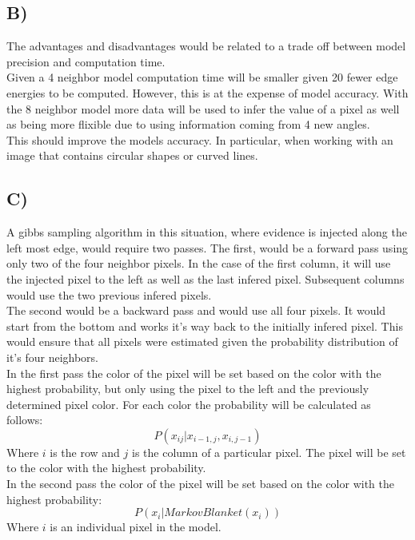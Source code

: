 \documentclass{report}
\begin{document}
\subsection*{B)}
The advantages and disadvantages would be related to a trade off between
model precision and computation time.\\

Given a 4 neighbor model computation time will be smaller given 20 fewer edge
energies to be computed. However, this is at the expense of model accuracy. With
the 8 neighbor model more data will be used to infer the value of a pixel as well
as being more flixible due to using information coming from 4 new angles. \\

This should improve the models accuracy. In particular, when working with an image
that contains circular shapes or curved lines.
\subsection*{C)}
A gibbs sampling algorithm in this situation, where evidence is injected along
the left most edge, would require two passes. The first, would be a forward pass
using only two of the four neighbor pixels. In the case of the first column, it
will use the injected pixel to the left as well as the last infered pixel. Subsequent
columns would use the two previous infered pixels.\\

The second would be a backward pass and would use all four pixels. It would start
from the bottom and works it's way back to the initially infered pixel. This would
ensure that all pixels were estimated given the probability distribution of it's four
neighbors.\\

In the first pass the color of the pixel will be set based on the color with the
highest probability, but only using the pixel to the left and the previously determined
pixel color. For each color the probability will be calculated as follows:
\begin{equation}
  P(x_{ij} | x_{i-1, j}, x_{i, j-1})
\end{equation}
Where $i$ is the row and $j$ is the column of a particular pixel. The pixel will be
set to the color with the highest probability.\\

In the second pass the color of the pixel will be set based on the color with the
highest probability:
\begin{equation}
  P(x_i | MarkovBlanket(x_i))
\end{equation}
Where $i$ is an individual pixel in the model.
\end{document}
